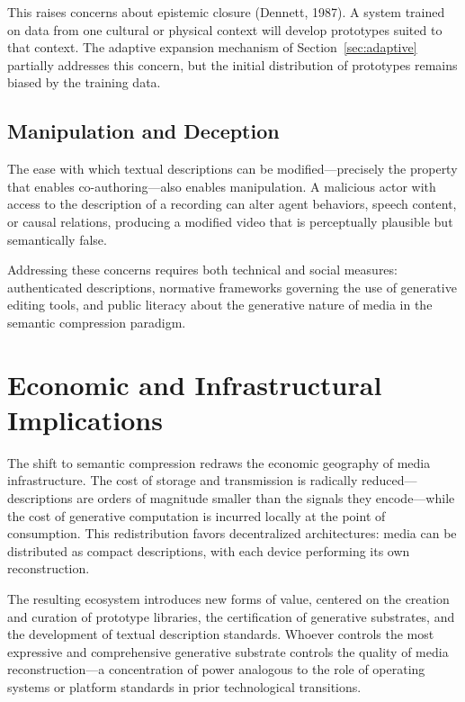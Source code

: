 \documentclass[11pt,a4paper]{article}
\theoremstyle{definition}
\theoremstyle{remark}
\begin{document}
This raises concerns about epistemic closure (Dennett, 1987). A system trained on data from one cultural or physical context will develop prototypes suited to that context. The adaptive expansion mechanism of Section~\ref{sec:adaptive} partially addresses this concern, but the initial distribution of prototypes remains biased by the training data.

\subsection{Manipulation and Deception}

The ease with which textual descriptions can be modified---precisely the property that enables co-authoring---also enables manipulation. A malicious actor with access to the description of a recording can alter agent behaviors, speech content, or causal relations, producing a modified video that is perceptually plausible but semantically false.

Addressing these concerns requires both technical and social measures: authenticated descriptions, normative frameworks governing the use of generative editing tools, and public literacy about the generative nature of media in the semantic compression paradigm.

\section{Economic and Infrastructural Implications}
\label{sec:economics}

The shift to semantic compression redraws the economic geography of media infrastructure. The cost of storage and transmission is radically reduced---descriptions are orders of magnitude smaller than the signals they encode---while the cost of generative computation is incurred locally at the point of consumption. This redistribution favors decentralized architectures: media can be distributed as compact descriptions, with each device performing its own reconstruction.

The resulting ecosystem introduces new forms of value, centered on the creation and curation of prototype libraries, the certification of generative substrates, and the development of textual description standards. Whoever controls the most expressive and comprehensive generative substrate controls the quality of media reconstruction---a concentration of power analogous to the role of operating systems or platform standards in prior technological transitions.
\end{document}
